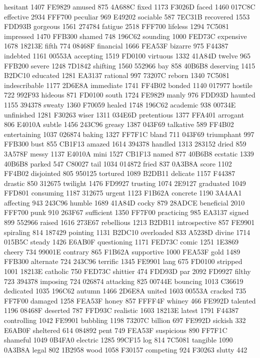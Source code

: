 hesitant 1407 FE9829 amused 875 4A688C fixed 1173 F3026D faced 1460
017C8C effective 2934 FFF700 peculiar 969 E49202 sociable 587 7EC31B
recovered 1553 FDD93B gorgeous 1561 274784 fatigue 2518 FFF700 lifeless
1294 7C5081 impressed 1470 FFB300 shamed 748 196C62 sounding 1000
FED73C expensive 1678 18213E fifth 774 08468F financial 1666 FEA53F
bizarre 975 F44387 indebted 1161 00553A accepting 1519 FD0100 virtuous
1332 41A84D twelve 965 FFB200 severe 1248 7D1842 shifting 1560 552966
bay 858 40B6B8 deserving 1415 B2DC10 educated 1281 EA3137 rational 997
73207C reborn 1340 7C5081 indescribable 1177 2D6E8A immediate 1741
FF4B02 bonded 1140 017977 hostile 722 992F93 hideous 871 FD0100 south
1724 FE9829 manly 976 FDD93D haunted 1155 394378 sweaty 1360 F70059
healed 1748 196C62 academic 938 00734E unfinished 1281 F30263 wiser
1311 034E6D pretentious 1377 FFA401 arrogant 806 E4010A subtle 1456
243C96 greasy 1387 043F69 talkative 589 FF4B02 entertaining 1037 026874
baking 1327 FF7F1C bland 711 043F69 triumphant 997 FFB300 bust 855
CB1F13 amazed 1614 394378 handled 1313 283152 dried 859 3A578F messy
1137 E4010A mini 1527 CB1F13 named 877 40B6B8 ecstatic 1339 40B6B8
parked 547 C80027 tail 1034 014872 fried 837 0A3B8A score 1102 FF4B02
disjointed 805 950125 tortured 1089 B2DB11 delicate 1157 F44387 drastic
850 312675 twilight 1476 FD9927 trusting 1074 2E9127 graduated 1049
FFD801 consuming 1187 312675 urgent 1123 F1B62A concrete 1190 3A4AA1
affecting 943 243C96 humble 1689 41A84D cocky 879 28ADCE beneficial
2010 FFF700 punk 910 263F67 sufficient 1350 FF7F00 practicing 985
EA3137 signed 899 552966 raised 1616 273E67 rebellious 1213 B2DB11
introspective 857 FE9901 spiraling 814 187429 pointing 1131 B2DC10
overloaded 833 A5238D divine 1714 015B5C steady 1426 E6AB0F questioning
1171 FED73C comic 1251 1E3869 cheery 734 99001E contrary 865 F1B62A
supportive 1000 FEA53F gold 1489 FFB300 alternate 724 243C96 terrific
1345 FE9901 lang 675 FD0100 stripped 1001 18213E catholic 750 FED73C
shittier 474 FDD93D par 2092 FD9927 filthy 723 394378 imposing 724
026874 attacking 825 00744E bouncing 1013 C36619 dedicated 1035 196C62
autumn 1466 2D6E8A united 1603 00553A cracked 735 FF7F00 damaged 1258
FEA53F honey 857 FFFF4F whiney 466 FE992D talented 1196 08468F deserted
787 FFD93C realistic 1603 18213E latest 1791 F44387 controlling 1042
FE9901 bubbling 1198 73207C billion 697 FE992D sickish 332 E6AB0F
sheltered 614 084892 pent 749 FEA53F suspicious 890 FF7F1C shameful
1049 0B4FA0 electric 1285 99CF15 log 814 7C5081 tangible 1090 0A3B8A
legal 802 1B2958 wood 1058 F30157 competing 924 F30263 slutty 442
